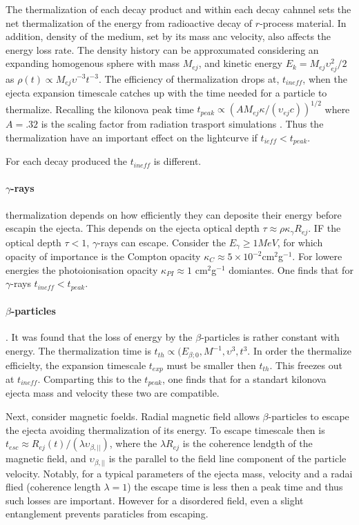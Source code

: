 \documentclass[11pt,a4paper,headinclude=true,DIV=14,BCOR=8mm,chapterprefix,listof=totoc,twoside,openright,abstracton]{scrbook}
\begin{document}
The thermalization of each decay product and within each decay cahnnel sets the net thermalization of the energy from radioactive  decay of $r$-process material. In addition, density of the medium, set by its mass anc velocity, also affects the energy loss rate.
The density history can be approxumated considering an expanding homogenous sphere with mass $M_{ej}$, and kinetic energy $E_k = M_{ej} \upsilon_{ej}^2 / 2$ as $\rho(t) \propto M_{ej} \upsilon^{-3} t^{-3}$. 
The efficiency of thermalization drops at, $t_{ineff}$, when the ejecta expansion timescale catches up with the time needed for a particle to thermalize.
Recalling the kilonova peak time $t_{peak} \propto (A M_{ej} \kappa / (\upsilon_{ej} c))^{1/2}$ where $A=.32$ is the scaling factor from radiation trasport simulations \cite{(e.g. Barnes & Kasen 2013)}. 
Thus the thermalization have an important effect on the lightcurve if $t_{ieff} < t_{peak}$. 

For each decay produced the $t_{ineff}$ is different. 
\paragraph{$\gamma$-rays} thermalization depends on how efficiently they can deposite their energy before escapin the ejecta. This depends on the ejecta optical depth $\tau\approx\rho\kappa_{\gamma}R_{ej}$. IF the optical depth $\tau<1$, $\gamma$-rays can escape. Consider the $E_{\gamma}\geq 1MeV$, for which opacity of importance is the Compton opacity $\kappa_C\approx5\times10^{-2}$cm$^2$g$^{-1}$. For lowere energies the photoionisation opacity $\kappa_{PI}\approx 1$ cm$^2$g$^{-1}$ domiantes. 
One finds that for $\gamma$-rays $t_{ineff}<t_{peak}$.

\paragraph{$\beta$-particles}.
It was found that the loss of energy by the $\beta$-particles is rather constant with energy. The thermalization time is $t_{th}\propto(E_{\beta;0}, M^{-1}, \upsilon^{3}, t^{3}$. 
In order the thermalize efficielty, the expansion timescale $t_{exp}$ must be smaller then $t_{th}$. This freezes out at $t_{ineff}$. Comparting this to the $t_{peak}$, one finds that for a standart kilonova ejecta mass and velocity these two are compatible.

Next, consider magnetic foelds. 
Radial magnetic field allows $\beta$-particles to escape the ejecta avoiding thermalization of its energy. To escape timescale then is $t_{esc}\approx R_{ej}(t)/(\lambda \upsilon_{\beta,||})$, where the $\lambda R_{ej}$ is the coherence lendgth of the magnetic field, and $\upsilon_{\beta,||}$ is the parallel to the field line component of the particle velocity. 
Notably, for a typical parameters of the ejecta mass, velocity and a radai flied (coherence length $\lambda=1$) the escape time is less then a peak time and thus such losses are important. However for a disordered field, even a slight entanglement prevents paraticles from escaping.
\end{document}
